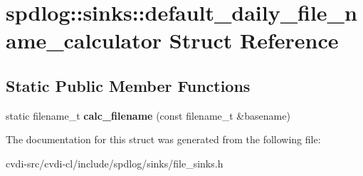 \hypertarget{structspdlog_1_1sinks_1_1default__daily__file__name__calculator}{}\section{spdlog\+:\+:sinks\+:\+:default\+\_\+daily\+\_\+file\+\_\+name\+\_\+calculator Struct Reference}
\label{structspdlog_1_1sinks_1_1default__daily__file__name__calculator}
\subsection*{Static Public Member Functions}
\begin{DoxyCompactItemize}
\item 
static filename\+\_\+t {\bfseries calc\+\_\+filename} (const filename\+\_\+t \&basename)\hypertarget{structspdlog_1_1sinks_1_1default__daily__file__name__calculator_ae2428648ba995d443cd514a3eef071ea}{}\label{structspdlog_1_1sinks_1_1default__daily__file__name__calculator_ae2428648ba995d443cd514a3eef071ea}

\end{DoxyCompactItemize}


The documentation for this struct was generated from the following file\+:\begin{DoxyCompactItemize}
\item 
cvdi-\/src/cvdi-\/cl/include/spdlog/sinks/file\+\_\+sinks.\+h\end{DoxyCompactItemize}
